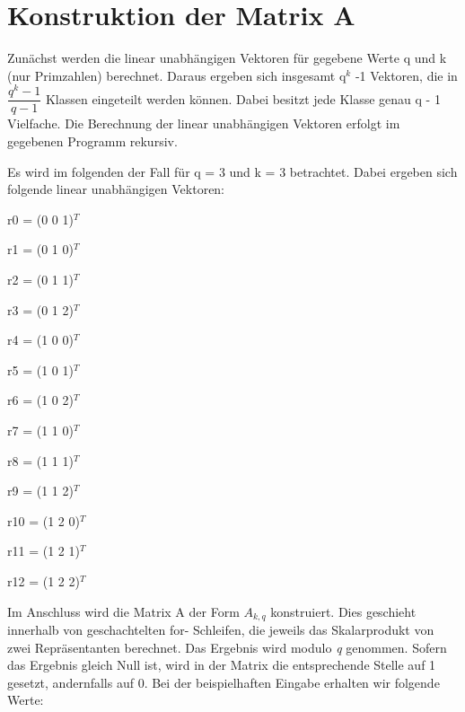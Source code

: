 \documentclass[12pt, titlepage]{article}
\begin{document}
\section{Konstruktion der Matrix A}
Zunächst werden die linear unabhängigen Vektoren für gegebene Werte q und k (nur Primzahlen) berechnet.
Daraus ergeben sich insgesamt q$^k$ -1 Vektoren, die in $\dfrac{q^{k}-1}{q-1}$ Klassen eingeteilt werden können.
Dabei besitzt jede Klasse genau q - 1 Vielfache.
Die Berechnung der linear unabhängigen Vektoren erfolgt im gegebenen Programm rekursiv.

\newpage
Es wird im folgenden der Fall für q = 3 und k = 3 betrachtet.
Dabei ergeben sich folgende linear unabhängigen Vektoren:
\begin{description}
\item r0 = (0 0 1)$^T$
\item r1 = (0 1 0)$^T$
\item r2 = (0 1 1)$^T$
\item r3 = (0 1 2)$^T$
\item r4 = (1 0 0)$^T$
\item r5 = (1 0 1)$^T$
\item r6 = (1 0 2)$^T$
\item r7 = (1 1 0)$^T$
\item r8 = (1 1 1)$^T$
\item r9 = (1 1 2)$^T$
\item r10 = (1 2 0)$^T$
\item r11 = (1 2 1)$^T$
\item r12 = (1 2 2)$^T$
\end{description}

Im Anschluss wird die Matrix A der Form $A_{k,q}$ konstruiert.
Dies geschieht innerhalb von geschachtelten for- Schleifen, die jeweils das Skalarprodukt von zwei Repräsentanten berechnet.
Das Ergebnis wird modulo \textit{q} genommen.
Sofern das Ergebnis gleich Null ist, wird in der Matrix die entsprechende Stelle auf 1 gesetzt, andernfalls auf 0.
Bei der beispielhaften Eingabe erhalten wir folgende Werte:
\end{document}
